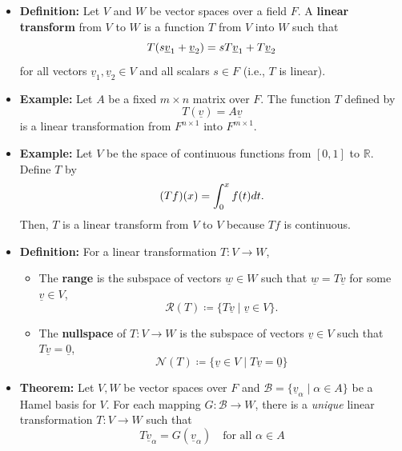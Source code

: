 \documentclass[11pt,twoside]{report}
\newcommand{\bbR}{{\mathbb{R}}}
\newcommand{\vecnot}{\underline}
\begin{document}
\begin{itemize}
\item \textbf{Definition:} Let $V$ and $W$ be vector spaces over a field $F$.
A \textbf{linear transform} from $V$ to $W$ is a function $T$ from $V$ into $W$ such that 
\begin{equation*}
T \left( s \vecnot{v}_1 + \vecnot{v}_2 \right)
= s T \vecnot{v}_1 + T \vecnot{v}_2  \vspace{-2mm}
\end{equation*}
for all vectors $\vecnot{v}_1, \vecnot{v}_2 \in V$ and all scalars $s \in F$ (i.e., $T$ is linear).

\item \textbf{Example:} Let $A$ be a fixed $m \times n$ matrix over $F$.
The function $T$ defined by 
\[
T \left( \vecnot{v} \right) = A \vecnot{v}
\]
is a linear transformation from $F^{n \times 1}$ into $F^{m \times 1}$.

\item \textbf{Example:}  Let $V$ be the space of continuous functions from $[0,1]$ to $\bbR$. Define $T$ by  
\begin{equation*}
(Tf)(x) = \int_{0}^x f(t) dt .  \vspace{-2mm}
\end{equation*}
Then, $T$ is a linear transform from $V$ to $V$ because $Tf$ is continuous.


\item \textbf{Definition:} 
For a linear transformation $T \colon V \to W$, 
\begin{itemize}
\item  The \textbf{range}  is the subspace of vectors $\vecnot{w} \in W$ such that $\vecnot{w} = T \vecnot{v}$ for some $\vecnot{v} \in V$, 
\[
 \mathcal{R}(T)\coloneqq%
  \{ T \vecnot{v} \mid \vecnot{v} \in V\}. 
\]

\item  The \textbf{nullspace} of $T\colon V \to W$ is the subspace of vectors $\vecnot{v} \in V$ such that $T \vecnot{v} = \vecnot{0}$,
\[ 
\mathcal{N}(T)  \coloneqq \{ \vecnot{v}\in V \mid T \vecnot{v} = \vecnot{0} \} 
\]

\end{itemize} 

\item  \textbf{Theorem:}  
Let $V,W$ be vector spaces over $F$ and $\mathcal{B} = \{ \vecnot{v}_{\alpha} \mid \alpha \in A \}$ be a Hamel basis for $V$.
For each mapping $G \colon \mathcal{B} \rightarrow W$, there is a \emph{unique} linear transformation $T \colon V \rightarrow W$ such that
\[
T \vecnot{v}_{\alpha} = G \left( \vecnot{v}_{\alpha} \right) \quad  \text{for all $\alpha \in A$}
\]


\end{itemize}
\end{document}
